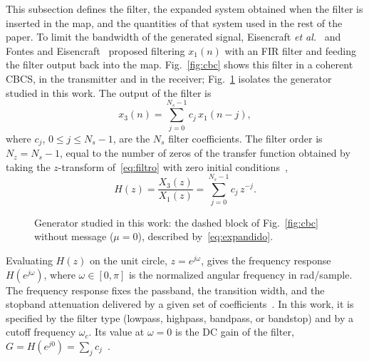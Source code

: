 \documentclass[journal]{IEEEtran}
\begin{document}
This subsection defines the filter, the expanded system obtained when the
filter is inserted in the map, and the quantities of that system used in the
rest of the paper. To limit the bandwidth of the generated signal, Eisencraft
\textit{et al.}~\cite{Eisencraft2009} and Fontes and
Eisencraft~\cite{Fontes2016} proposed filtering $x_1(n)$ with an FIR filter and feeding the filter output back into the
map. Fig.~\ref{fig:cbc} shows this filter in a coherent CBCS, in the transmitter and
in the receiver; Fig.~\ref{fig:generator} isolates the generator studied in this
work. The output of the filter is
\begin{equation}
  x_3(n) = \sum_{j=0}^{N_s-1} c_j\, x_1(n-j),
  \label{eq:filtro}
\end{equation}
where $c_j$, $0\le j\le N_s-1$, are the $N_s$ filter coefficients. The filter
order is $N_z=N_s-1$, equal to the number of zeros of the transfer function
obtained by taking the $z$-transform of~\eqref{eq:filtro} with zero initial
conditions~\cite{Oppenheim2009},
\begin{equation}
  H(z)=\frac{X_3(z)}{X_1(z)}=\sum_{j=0}^{N_s-1} c_j\, z^{-j}.
  \label{eq:tf}
\end{equation}

\begin{figure}[!t]
\centering
{}
\caption{Generator studied in this work: the dashed block of
Fig.~\ref{fig:cbc} without message ($\mu=0$), described by~\eqref{eq:expandido}.}
\label{fig:generator}
\end{figure}

Evaluating $H(z)$ on the unit circle, $z=e^{j\omega}$, gives the frequency
response $H(e^{j\omega})$, where $\omega\in[0,\pi]$ is the normalized angular
frequency in rad/sample. The frequency response fixes the passband, the
transition width, and the stopband attenuation delivered by a given set of
coefficients~\cite{Oppenheim2009}. In this work, it is specified by the filter
type (lowpass, highpass, bandpass, or bandstop) and by a cutoff frequency
$\omega_c$. Its value at $\omega=0$ is the DC gain of the filter,
$G=H(e^{j0})=\sum_{j}c_j$~\cite{Oppenheim2009}.
\end{document}
